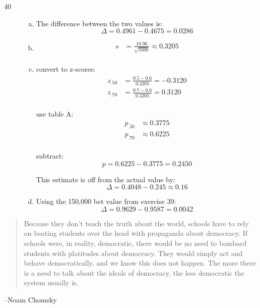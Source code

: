 \documentclass[letterpaper]{exam}
\begin{document}
\begin{description}
      \newpage

      \item[40]
        \begin{enumerate}[(a)]
          \item The difference between the two values is:
            \[
              \Delta = 0.4961 - 0.4675 = \boxed{ 0.0286 }
            \]

          \item
            \begin{align*}
              s &= \frac{18.96}{\sqrt{3500}} \approx \boxed{ 0.3205 } \\
            \end{align*}
            
          \item
            convert to z-scores:
            \begin{align*}
              z_{.50} &= \frac{0.5 - 0.6}{0.3205} = -0.3120 \\
              z_{.70} &= \frac{0.7 - 0.6}{0.3205} = 0.3120 \\
            \end{align*}

            use table A:
            \begin{align*}
              p_{.50} & \approx 0.3775 \\
              p_{.70} & \approx 0.6225 \\
            \end{align*}

            subtract:
            \[
              p = 0.6225 - 0.3775 = 0.2450
            \]

            This estimate is off from the actual value by:
            \[
              \Delta = 0.4048 - 0.245 \approx \boxed{ 0.16 }
            \]
            
          \item Using the 150,000 bet value from exercise 39:
            \[
              \Delta = 0.9629 - 0.9587 = \boxed{ 0.0042 }
            \]

        \end{enumerate}
  \end{description}

  \else
    \vspace{10 cm}
    \begin{quote}
      \begin{em}
        Because they don't teach the truth about the world, schools have to rely on
        beating students over the head with propaganda about democracy. If schools were,
        in reality, democratic, there would be no need to bombard students with
        platitudes about democracy. They would simply act and behave democratically, and
        we know this does not happen. The more there is a need to talk about the ideals
        of democracy, the less democratic the system usually is.
      \end{em}
    \end{quote}
    \hspace{1 cm} --Noam Chomsky
  \fi
\end{document}
